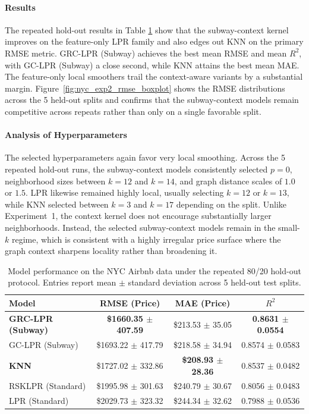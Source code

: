 \documentclass[final,1p,times,authoryear]{elsarticle}
\begin{document}
\paragraph{\textbf{Results}}
The repeated hold-out results in Table \ref{tab:results_nyc} show that the subway-context kernel improves on the feature-only LPR family and also edges out KNN on the primary RMSE metric. GRC-LPR (Subway) achieves the best mean RMSE and mean \(R^2\), with GC-LPR (Subway) a close second, while KNN attains the best mean MAE. The feature-only local smoothers trail the context-aware variants by a substantial margin. Figure~\ref{fig:nyc_exp2_rmse_boxplot} shows the RMSE distributions across the 5 held-out splits and confirms that the subway-context models remain competitive across repeats rather than only on a single favorable split.

\paragraph{\textbf{Analysis of Hyperparameters}}
The selected hyperparameters again favor very local smoothing. Across the 5 repeated hold-out runs, the subway-context models consistently selected \(p=0\), neighborhood sizes between \(k=12\) and \(k=14\), and graph distance scales of \(1.0\) or \(1.5\). LPR likewise remained highly local, usually selecting \(k=12\) or \(k=13\), while KNN selected between \(k=3\) and \(k=17\) depending on the split. Unlike Experiment~1, the context kernel does not encourage substantially larger neighborhoods. Instead, the selected subway-context models remain in the small-\(k\) regime, which is consistent with a highly irregular price surface where the graph context sharpens locality rather than broadening it.

\begin{table}[h]
\centering
\caption{Model performance on the NYC Airbnb data under the repeated 80/20 hold-out protocol. Entries report mean \(\pm\) standard deviation across 5 held-out test splits.}
\label{tab:results_nyc}
\begin{tabular}{@{}lccc@{}}
\toprule
\textbf{Model} & \textbf{RMSE (Price)} & \textbf{MAE (Price)} & \textbf{$R^2$} \\ \midrule
\textbf{GRC-LPR (Subway)} & \textbf{\$1660.35 \(\pm\) 407.59} & \$213.53 \(\pm\) 35.05 & \textbf{0.8631 \(\pm\) 0.0554} \\
GC-LPR (Subway) & \$1693.22 \(\pm\) 417.79 & \$218.58 \(\pm\) 34.94 & 0.8574 \(\pm\) 0.0583 \\
\textbf{KNN} & \$1727.02 \(\pm\) 332.86 & \textbf{\$208.93 \(\pm\) 28.36} & 0.8537 \(\pm\) 0.0482 \\
RSKLPR (Standard) & \$1995.98 \(\pm\) 301.63 & \$240.79 \(\pm\) 30.67 & 0.8056 \(\pm\) 0.0483 \\
LPR (Standard) & \$2029.73 \(\pm\) 323.32 & \$244.34 \(\pm\) 32.62 & 0.7988 \(\pm\) 0.0536 \\ \bottomrule
\end{tabular}
\end{table}
\end{document}
